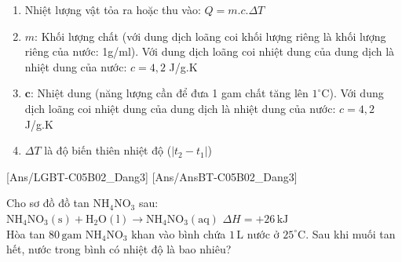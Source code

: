 \documentclass[Main.tex]{subfiles}
\begin{document}
\begin{hopdongian}
	\begin{enumerate}
		\item Nhiệt lượng vật tỏa ra hoặc thu vào: $Q = m.c.\Delta T$
		\item $m$: Khối lượng chất (với dung dịch loãng coi khối lượng riêng là khối lượng riêng của nước: 1g/ml). Với dung dịch loãng coi nhiệt dung của dung dịch là nhiệt dung của nước: $c = 4,2$ J/g.K
		\item $\textbf{c}$: Nhiệt dung (năng lượng cần để đưa 1 gam chất tăng lên $1^\circ$C). Với dung dịch loãng coi nhiệt dung của dung dịch là nhiệt dung của nước: $c = 4,2$ J/g.K
		\item $\Delta T$ là độ biến thiên nhiệt độ ($|t_2 - t_1|$)
	\end{enumerate}
\end{hopdongian}
[Ans/LGBT-C05B02_Dang3]
[Ans/AnsBT-C05B02_Dang3]
\begin{bt}
	Cho sơ đồ đồ tan $\mathrm{NH_4NO_3}$ sau:
	\\
	$\mathrm{NH_4NO_3 (s) + H_2O (l) \longrightarrow NH_4NO_3 (aq)}$ \hspace{1cm} $\Delta H = + 26\,\mathrm{kJ}$
	\\
	Hòa tan $80\,\mathrm{gam}$ $\mathrm{NH_4NO_3}$ khan vào bình chứa $1\,\mathrm{L}$ nước ở $25^\circ\mathrm{C}$. Sau khi muối tan hết, nước trong bình có nhiệt độ là bao nhiêu?
\end{bt}
\end{document}
